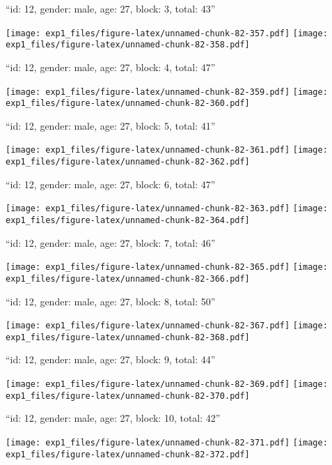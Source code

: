 \documentclass[11pt,,]{article}
\begin{document}
\newpage
[1] 

``id: 12, gender: male, age: 27, block: 3, total: 43''

\texttt{[image: exp1\_files/figure-latex/unnamed-chunk-82-357.pdf]}
\texttt{[image: exp1\_files/figure-latex/unnamed-chunk-82-358.pdf]}

\newpage
[1] 

``id: 12, gender: male, age: 27, block: 4, total: 47''

\texttt{[image: exp1\_files/figure-latex/unnamed-chunk-82-359.pdf]}
\texttt{[image: exp1\_files/figure-latex/unnamed-chunk-82-360.pdf]}

\newpage
[1] 

``id: 12, gender: male, age: 27, block: 5, total: 41''

\texttt{[image: exp1\_files/figure-latex/unnamed-chunk-82-361.pdf]}
\texttt{[image: exp1\_files/figure-latex/unnamed-chunk-82-362.pdf]}

\newpage
[1] 

``id: 12, gender: male, age: 27, block: 6, total: 47''

\texttt{[image: exp1\_files/figure-latex/unnamed-chunk-82-363.pdf]}
\texttt{[image: exp1\_files/figure-latex/unnamed-chunk-82-364.pdf]}

\newpage
[1] 

``id: 12, gender: male, age: 27, block: 7, total: 46''

\texttt{[image: exp1\_files/figure-latex/unnamed-chunk-82-365.pdf]}
\texttt{[image: exp1\_files/figure-latex/unnamed-chunk-82-366.pdf]}

\newpage
[1] 

``id: 12, gender: male, age: 27, block: 8, total: 50''

\texttt{[image: exp1\_files/figure-latex/unnamed-chunk-82-367.pdf]}
\texttt{[image: exp1\_files/figure-latex/unnamed-chunk-82-368.pdf]}

\newpage
[1] 

``id: 12, gender: male, age: 27, block: 9, total: 44''

\texttt{[image: exp1\_files/figure-latex/unnamed-chunk-82-369.pdf]}
\texttt{[image: exp1\_files/figure-latex/unnamed-chunk-82-370.pdf]}

\newpage
[1] 

``id: 12, gender: male, age: 27, block: 10, total: 42''

\texttt{[image: exp1\_files/figure-latex/unnamed-chunk-82-371.pdf]}
\texttt{[image: exp1\_files/figure-latex/unnamed-chunk-82-372.pdf]}
\end{document}
